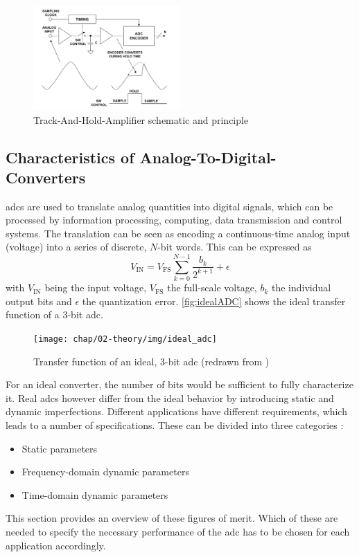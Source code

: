 \begin{figure}[tbh]
	\centering
	\includegraphics[width = 0.5\textwidth]{chap/02-theory/img/tha}
	\caption{Track-And-Hold-Amplifier schematic and principle \cite{walt}}
	\label{fig:tha}
\end{figure}

\subsection{Characteristics of Analog-To-Digital-Converters}
\Glspl{adc} are used to translate analog quantities into digital signals, which can be processed by information processing, computing, data transmission and control systems. The translation can be seen as encoding a continuous-time analog input (voltage) into a series of discrete, $N$-bit words. This can be expressed as
\begin{equation}
	V_{\text{IN}} = V_{\text{FS}} \sum_{k = 0}^{N-1} \frac{b_k}{2^{k+1}} + \epsilon
\end{equation}
with $V_{\text{IN}}$ being the input voltage, $V_{\text{FS}}$ the full-scale voltage, $b_k$ the individual output bits and $\epsilon$ the quantization error. \autoref{fig:idealADC} shows the ideal transfer function of a 3-bit \gls{adc}.
\begin{figure}[H]
	\centering
	\texttt{[image: chap/02-theory/img/ideal\_adc]}
	\caption{Transfer function of an ideal, 3-bit \gls{adc} (redrawn from \cite{Lundberg})}
	\label{fig:idealADC}
\end{figure}


For an ideal converter, the number of bits would be sufficient to fully characterize it.
Real \glspl{adc} however differ from the ideal behavior by introducing static and dynamic imperfections.
Different applications have different requirements, which leads to a number of specifications. These can be divided into three categories \cite{Lundberg}:
\begin{itemize}[noitemsep]
	\item Static parameters
	\item Frequency-domain dynamic parameters
	\item Time-domain dynamic parameters
\end{itemize}
This section provides an overview of these figures of merit. Which of these are needed to specify the necessary performance of the \gls{adc} has to be chosen for each application accordingly.


